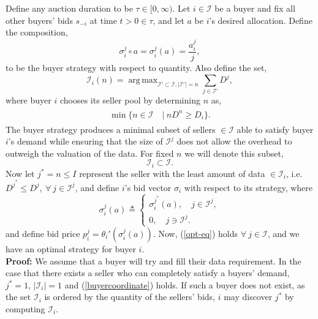 \documentclass[sigconf, anonymous]{acmart}
\newcommand{\mcI}{\mathcal{I}}
\newcommand{\g}{\sigma}
\DeclareMathOperator*{\argmax}{arg\,max}
\theoremstyle{definition}
\begin{document}
{
\label{buyerstrategy}
Define any auction duration to be $\tau \in [0,\infty)$. 
Let $i\in\mcI$ be a buyer and fix all other buyers' bids $s_{-i}$ at time
$t>0\in\tau$, and let $a$ be $i$'s desired allocation. 
Define the composition,
$$
     \g_i^j \circ a = \g_i^j(a) = \frac{a_i^j}{j},
$$
to be the buyer strategy with respect to quantity.
Also define the set,
$$
    \mcI_i(n) =\argmax_{\mcI' \subset \mcI, \vert\mcI'\vert =
n}\sum_{j\in\mcI'} D^j,
$$
where buyer $i$ chooses its seller pool by determining $n$ as,
\begin{align}
\begin{split}\label{buyercoordinate}
    \min\big\lbrace n \in \mcI \ &\vert \ n D^n\ge D_i \big\rbrace. 
\end{split}
\end{align} 
The buyer strategy produces a minimal subset of sellers $\in \mcI$ 
able to satisfy buyer $i$'s demand while ensuring that the size of $\mcI^j$
does not allow the overhead to outweigh the valuation of the data. For 
fixed $n$ we will denote this subset,
\begin{equation}\label{sellers}
    \mcI_i \subset \mcI.
\end{equation}  
Now let $j^* = n \le I$ represent the seller with the least amount of data
$\in\mcI_i$, i.e. $D^{j^*} \le D^j, \ \forall\ j \in\mcI^j$, and define $i$'s bid
vector $\g_i$ with respect to its strategy, where
\begin{equation}\label{opt-eq}
    \g_i^j(a) \triangleq \begin{cases} \g_i^{j^*}(a), \quad j\in\mcI^j,\\
            0, \quad j\ni\mcI^j.\end{cases}
\end{equation}
and define bid price $p_i^j = \theta_i'(\g_i^j(a))$.
Now, (\ref{opt-eq}) holds $\forall \ j\in\mcI$,
and we have an optimal strategy for buyer $i$.
}\\
\textbf{Proof:}
We assume that a buyer will try and fill their data requirement.
In the case that there exists a seller who can completely satisfy a buyers'
demand, $j^*=1$, $\vert \mcI_i\vert =1$ and (\ref{buyercoordinate}) holds. If such a buyer does not exist,
as the set $\mcI_i$ is ordered by the quantity of the sellers' bids, $i$ may discover 
$j^*$ by computing $\mcI_i$.
\end{document}
